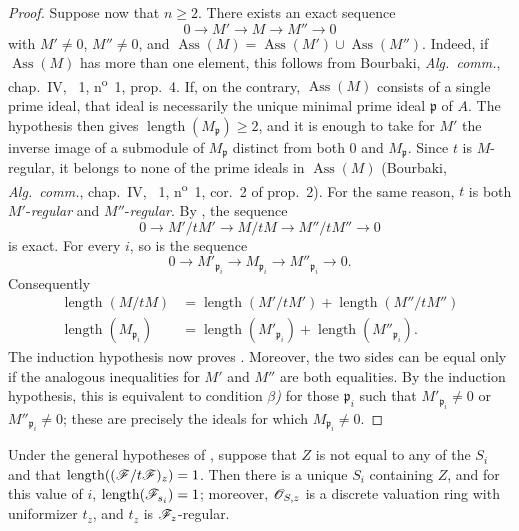 \begin{proof}
Suppose now that $n\geqslant 2$.
There exists an exact sequence
\[
0\longrightarrow M'\longrightarrow M\longrightarrow M''\longrightarrow 0
\]
with $M'\neq 0$, $M''\neq 0$, and $\operatorname{Ass}(M)=\operatorname{Ass}(M')\cup\operatorname{Ass}(M'')$.
Indeed, if $\operatorname{Ass}(M)$ has more than one element, this follows from Bourbaki, \emph{Alg.\ comm.}, chap.~IV, \textsection~1, n\textsuperscript{o}~1, prop.~4.
If, on the contrary, $\operatorname{Ass}(M)$ consists of a single prime ideal, that ideal is necessarily the unique minimal prime ideal $\mathfrak p$ of $A$.
The hypothesis then gives $\operatorname{length}(M_{\mathfrak p})\geqslant 2$, and it is enough to take for $M'$ the inverse image of a submodule of $M_{\mathfrak p}$ distinct from both $0$ and $M_{\mathfrak p}$.
Since $t$ is $M$-regular, it belongs to none of the prime ideals in $\operatorname{Ass}(M)$ (Bourbaki, \emph{Alg.\ comm.}, chap.~IV, \textsection~1, n\textsuperscript{o}~1, cor.~2 of prop.~2).
For the same reason, $t$ is both $M'$-\emph{regular} and $M''$-\emph{regular}.
By , the sequence
\[
0\longrightarrow M'/tM'
 \longrightarrow M/tM
 \longrightarrow M''/tM''
 \longrightarrow 0
\]
is exact.
For every $i$, so is the sequence
\[
0\longrightarrow M'_{\mathfrak p_i}
 \longrightarrow M_{\mathfrak p_i}
 \longrightarrow M''_{\mathfrak p_i}
 \longrightarrow 0.
\]
Consequently
\[
\begin{aligned}
\operatorname{length}(M/tM)
  &=
  \operatorname{length}(M'/tM')
  +
  \operatorname{length}(M''/tM'')\\
\operatorname{length}(M_{\mathfrak p_i})
  &=
  \operatorname{length}(M'_{\mathfrak p_i})
  +
  \operatorname{length}(M''_{\mathfrak p_i}).
\end{aligned}
\]
The induction hypothesis now proves .
Moreover, the two sides can be equal only if the analogous inequalities for $M'$ and $M''$ are both equalities.
By the induction hypothesis, this is equivalent to condition \emph{$\beta$)} for those $\mathfrak p_i$ such that $M'_{\mathfrak p_i}\neq 0$ or $M''_{\mathfrak p_i}\neq 0$; these are precisely the ideals for which $M_{\mathfrak p_i}\neq 0$.
\end{proof}


\begin{corollary}[3.4.2]
\label{IV.3.4.2}
Under the general hypotheses of , suppose that $Z$ is not equal to any of the $S_i$ and that $\operatorname{length}((\mathscr{F}/t\mathscr{F})_z)=1$.
Then there is a unique $S_i$ containing $Z$, and for this value of $i$, $\operatorname{length}(\mathscr{F}_{s_i})=1$; moreover, $\mathscr{O}_{S,z}$ is a discrete valuation ring with uniformizer $t_z$, and $t_z$ is $\mathscr{F}_z$-regular.
\end{corollary}

